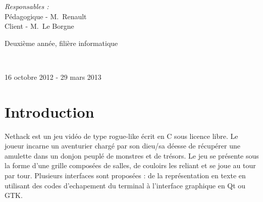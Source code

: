 \documentclass[12pt]{article}
\begin{document}
\begin{center}
\begin{center}
                    
                    \begin{flushright} 
                      \large
                      \emph{Responsables :} \\
					            Pédagogique - M.~Renault \\
						          Client - M.~Le Borgne\\
                    \end{flushright}
                  \end{center}
                  
                  
{}
                  
{\large Deuxième année, filière informatique}

~

{\large 16 octobre 2012 - 29 mars 2013}\\
                  
\end{center}
\thispagestyle{empty}
\pagebreak






\section{Introduction}

Nethack est un jeu vidéo de type rogue-like écrit en C sous licence libre. Le joueur incarne un aventurier chargé par son dieu/sa déesse de récupérer une amulette dans un donjon peuplé de monstres et de trésors. Le jeu se présente sous la forme d'une grille composées de salles, de couloirs les reliant et se joue au tour par tour. Plusieurs interfaces sont proposées : de la représentation en texte en utilisant des codes d'echapement du terminal à l'interface graphique en Qt ou GTK.
\end{document}
